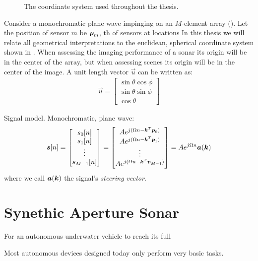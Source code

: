 \begin{figure}[th]
\caption{The coordinate system used throughout the thesis.}\label{geometry}
\end{figure}

Consider a monochromatic plane wave impinging on an $M$-element array (). Let the position of sensor $m$ be $\boldsymbol{p}_m$, th  of sensors at locations 
In this thesis we will relate all geometrical interpretations to the euclidean, spherical coordinate system shown in . When assessing the imaging performance of a sonar its origin will be in the center of the array, but when assessing scenes its origin will be in the center of the image. A unit length vector $\vec u$ can be written as:
%
\begin{align*}
\vec u =
\begin{bmatrix}
\sin\theta \cos\phi \\
\sin\theta \sin\phi \\
\cos\theta
\end{bmatrix}
\end{align*}
%

Signal model. Monochromatic, plane wave:
%
\begin{align}
\boldsymbol{s}[n] = \begin{bmatrix}
         s_0[n] \\ s_1[n] \\ \vdots \\ s_{M-1}[n]
        \end{bmatrix}
      = \begin{bmatrix}
         Ae^{j(\Omega n - \boldsymbol{k}^{\scriptscriptstyle T}\boldsymbol{p}_0)} \\
         Ae^{j(\Omega n - \boldsymbol{k}^{\scriptscriptstyle T}\boldsymbol{p}_1)} \\
         \vdots \\
         Ae^{j(\Omega n - \boldsymbol{k}^{\scriptscriptstyle T}\boldsymbol{p}_{M-1})}
        \end{bmatrix}
      = Ae^{j\Omega n}\boldsymbol{a}(\boldsymbol{k})
\end{align}
%
where we call $\boldsymbol{a}(\boldsymbol{k})$ the signal's \emph{steering vector}.





\section{Synethic Aperture Sonar}

For an autonomous underwater vehicle to reach its full 

Most autonomous devices designed today only perform very basic tasks.

